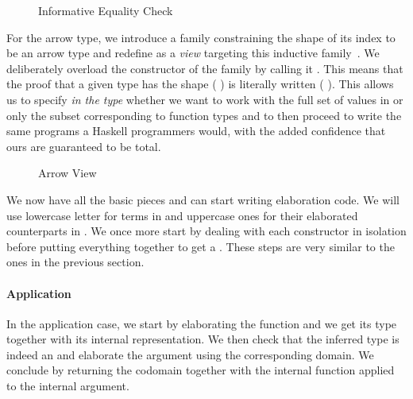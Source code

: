 \begin{figure}[h]
\caption{Informative Equality Check\label{fig:informativeeqcheck}}
\end{figure}

For the arrow type, we introduce a family  constraining the
shape of its index to be an arrow type and redefine  as
a \emph{view} targeting this inductive
family~\cite{DBLP:conf/popl/Wadler87,DBLP:journals/jfp/McBrideM04}.
%
We deliberately overload the constructor of the  family by calling
it . This means that the proof that a given type has the shape
{(  )} is literally written {(  )}.
This allows us to specify \emph{in the type} whether we want to work with the
full set of values in  or only the subset corresponding to function
types and to then proceed to write the same programs a Haskell programmers would,
with the added confidence that ours are guaranteed to be total.

\begin{figure}[h]
\begin{minipage}[t]{0.45\textwidth}
\end{minipage}\hfill\begin{minipage}[t]{0.45\textwidth}
\end{minipage}
\caption{Arrow View\label{fig:informativecheck}}
\end{figure}

We now have all the basic pieces and can start writing elaboration code. We
will use lowercase letter for terms in  and uppercase ones for their
elaborated counterparts in . We once more start by dealing with each
constructor in isolation before putting everything together to get a
. These steps are very similar to the ones in the previous
section.

\paragraph{Application} In the application case, we start by elaborating the
function and we get its type together with its internal representation. We then
check that the inferred type is indeed an  and elaborate the argument
using the corresponding domain. We conclude by returning the codomain together
with the internal function applied to the internal argument.
\begin{agdasnippet}
\end{agdasnippet}
